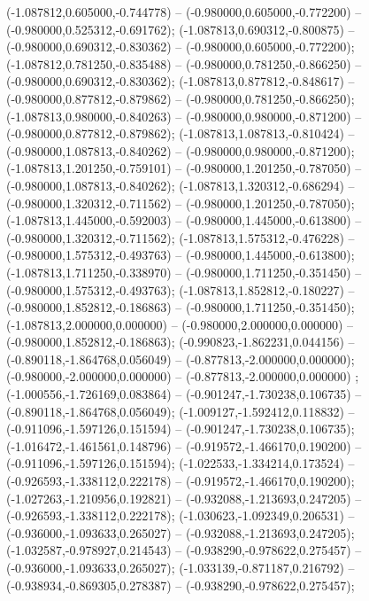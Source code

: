  (-1.087812,0.605000,-0.744778) -- (-0.980000,0.605000,-0.772200) -- (-0.980000,0.525312,-0.691762);
 (-1.087813,0.690312,-0.800875) -- (-0.980000,0.690312,-0.830362) -- (-0.980000,0.605000,-0.772200);
 (-1.087812,0.781250,-0.835488) -- (-0.980000,0.781250,-0.866250) -- (-0.980000,0.690312,-0.830362);
 (-1.087813,0.877812,-0.848617) -- (-0.980000,0.877812,-0.879862) -- (-0.980000,0.781250,-0.866250);
 (-1.087813,0.980000,-0.840263) -- (-0.980000,0.980000,-0.871200) -- (-0.980000,0.877812,-0.879862);
 (-1.087813,1.087813,-0.810424) -- (-0.980000,1.087813,-0.840262) -- (-0.980000,0.980000,-0.871200);
 (-1.087813,1.201250,-0.759101) -- (-0.980000,1.201250,-0.787050) -- (-0.980000,1.087813,-0.840262);
 (-1.087813,1.320312,-0.686294) -- (-0.980000,1.320312,-0.711562) -- (-0.980000,1.201250,-0.787050);
 (-1.087813,1.445000,-0.592003) -- (-0.980000,1.445000,-0.613800) -- (-0.980000,1.320312,-0.711562);
 (-1.087813,1.575312,-0.476228) -- (-0.980000,1.575312,-0.493763) -- (-0.980000,1.445000,-0.613800);
 (-1.087813,1.711250,-0.338970) -- (-0.980000,1.711250,-0.351450) -- (-0.980000,1.575312,-0.493763);
 (-1.087813,1.852812,-0.180227) -- (-0.980000,1.852812,-0.186863) -- (-0.980000,1.711250,-0.351450);
 (-1.087813,2.000000,0.000000) -- (-0.980000,2.000000,0.000000) -- (-0.980000,1.852812,-0.186863);
 (-0.990823,-1.862231,0.044156) -- (-0.890118,-1.864768,0.056049) -- (-0.877813,-2.000000,0.000000);
 (-0.980000,-2.000000,0.000000) -- (-0.877813,-2.000000,0.000000) ;
 (-1.000556,-1.726169,0.083864) -- (-0.901247,-1.730238,0.106735) -- (-0.890118,-1.864768,0.056049);
 (-1.009127,-1.592412,0.118832) -- (-0.911096,-1.597126,0.151594) -- (-0.901247,-1.730238,0.106735);
 (-1.016472,-1.461561,0.148796) -- (-0.919572,-1.466170,0.190200) -- (-0.911096,-1.597126,0.151594);
 (-1.022533,-1.334214,0.173524) -- (-0.926593,-1.338112,0.222178) -- (-0.919572,-1.466170,0.190200);
 (-1.027263,-1.210956,0.192821) -- (-0.932088,-1.213693,0.247205) -- (-0.926593,-1.338112,0.222178);
 (-1.030623,-1.092349,0.206531) -- (-0.936000,-1.093633,0.265027) -- (-0.932088,-1.213693,0.247205);
 (-1.032587,-0.978927,0.214543) -- (-0.938290,-0.978622,0.275457) -- (-0.936000,-1.093633,0.265027);
 (-1.033139,-0.871187,0.216792) -- (-0.938934,-0.869305,0.278387) -- (-0.938290,-0.978622,0.275457);
